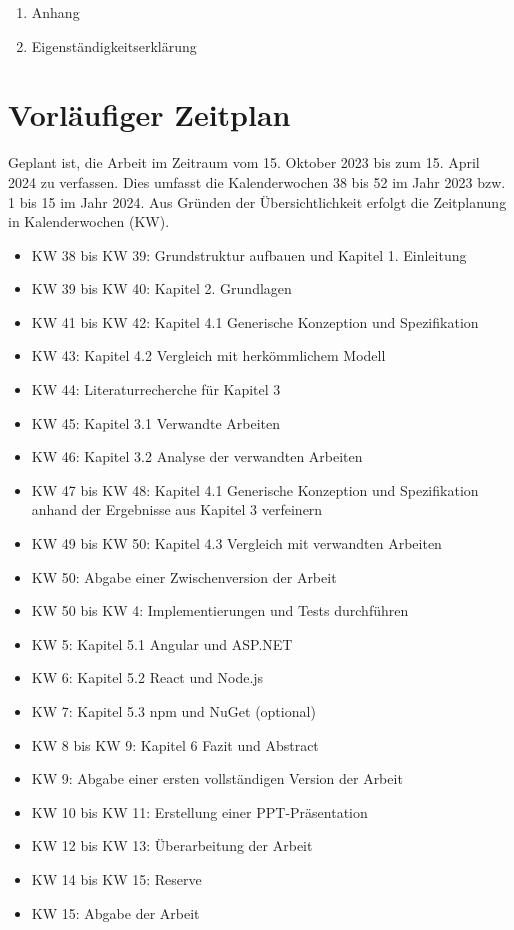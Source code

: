 \documentclass[12pt]{article} %
\begin{document}
\begin{enumerate}[label*=\Alph*]
\item Anhang
\item Eigenständigkeitserklärung 
\end{enumerate}


\section{Vorläufiger Zeitplan}

Geplant ist, die Arbeit im Zeitraum vom 15. Oktober 2023 bis zum 15. April 2024 zu verfassen. Dies umfasst die Kalenderwochen 38 bis 52 im Jahr 2023 bzw. 1 bis 15 im Jahr 2024. Aus Gründen der Übersichtlichkeit erfolgt die Zeitplanung in Kalenderwochen (KW).

\begin{itemize}
\item KW 38 bis KW 39: Grundstruktur aufbauen und Kapitel 1. Einleitung
\item KW 39 bis KW 40: Kapitel 2. Grundlagen
\item KW 41 bis KW 42: Kapitel 4.1 Generische Konzeption und Spezifikation
\item KW 43: Kapitel 4.2 Vergleich mit herkömmlichem Modell
\item KW 44: Literaturrecherche für Kapitel 3
\item KW 45: Kapitel 3.1 Verwandte Arbeiten
\item KW 46: Kapitel 3.2 Analyse der verwandten Arbeiten
\item KW 47 bis KW 48: Kapitel 4.1 Generische Konzeption und Spezifikation anhand der Ergebnisse aus Kapitel 3 verfeinern
\item KW 49 bis KW 50: Kapitel 4.3 Vergleich mit verwandten Arbeiten
\item KW 50: Abgabe einer Zwischenversion der Arbeit
\item KW 50 bis KW 4: Implementierungen und Tests durchführen
\item KW 5: Kapitel 5.1 Angular und ASP.NET
\item KW 6: Kapitel 5.2 React und Node.js
\item KW 7: Kapitel 5.3 npm und NuGet (optional)
\item KW 8 bis KW 9: Kapitel 6 Fazit und Abstract
\item KW 9: Abgabe einer ersten vollständigen Version der Arbeit
\item KW 10 bis KW 11: Erstellung einer PPT-Präsentation
\item KW 12 bis KW 13: Überarbeitung der Arbeit
\item KW 14 bis KW 15: Reserve
\item KW 15: Abgabe der Arbeit
\end{itemize}

\printbibliography
\end{document}
